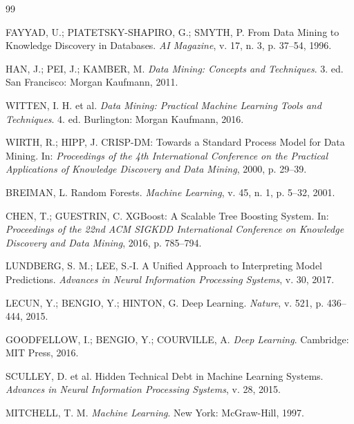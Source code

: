 \documentclass[12pt,a4paper]{article}
\begin{document}
\begin{thebibliography}{99}

FAYYAD, U.; PIATETSKY-SHAPIRO, G.; SMYTH, P. From Data Mining to Knowledge Discovery in Databases. \textit{AI Magazine}, v. 17, n. 3, p. 37--54, 1996.

HAN, J.; PEI, J.; KAMBER, M. \textit{Data Mining: Concepts and Techniques}. 3. ed. San Francisco: Morgan Kaufmann, 2011.

WITTEN, I. H. et al. \textit{Data Mining: Practical Machine Learning Tools and Techniques}. 4. ed. Burlington: Morgan Kaufmann, 2016.

WIRTH, R.; HIPP, J. CRISP-DM: Towards a Standard Process Model for Data Mining. In: \textit{Proceedings of the 4th International Conference on the Practical Applications of Knowledge Discovery and Data Mining}, 2000, p. 29--39.

BREIMAN, L. Random Forests. \textit{Machine Learning}, v. 45, n. 1, p. 5--32, 2001.

CHEN, T.; GUESTRIN, C. XGBoost: A Scalable Tree Boosting System. In: \textit{Proceedings of the 22nd ACM SIGKDD International Conference on Knowledge Discovery and Data Mining}, 2016, p. 785--794.

LUNDBERG, S. M.; LEE, S.-I. A Unified Approach to Interpreting Model Predictions. \textit{Advances in Neural Information Processing Systems}, v. 30, 2017.

LECUN, Y.; BENGIO, Y.; HINTON, G. Deep Learning. \textit{Nature}, v. 521, p. 436--444, 2015.

GOODFELLOW, I.; BENGIO, Y.; COURVILLE, A. \textit{Deep Learning}. Cambridge: MIT Press, 2016.

SCULLEY, D. et al. Hidden Technical Debt in Machine Learning Systems. \textit{Advances in Neural Information Processing Systems}, v. 28, 2015.

MITCHELL, T. M. \textit{Machine Learning}. New York: McGraw-Hill, 1997.

\end{thebibliography}
\end{document}
